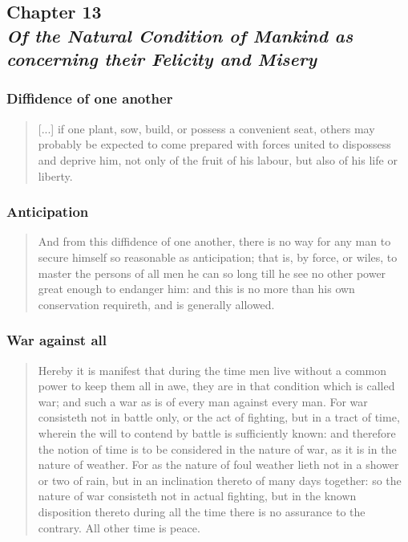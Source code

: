     \subsection[Of the Natural Condition of Mankind as concerning their Felicity and Misery]{Chapter 13 \\ \textit{Of the Natural Condition of Mankind as concerning their Felicity and Misery}}

        \subsubsection{Diffidence of one another}

            \begin{quote}
                [...] if one plant, sow, build, or possess a convenient seat, others may probably be expected to come prepared with forces united to dispossess and deprive him, not only of the fruit of his labour, but also of his life or liberty.
            \end{quote}

        \subsubsection{Anticipation}

            \begin{quote}
                And from this diffidence of one another, there is no way for any man to secure himself so reasonable as anticipation; that is, by force, or wiles, to master the persons of all men he can so long till he see no other power great enough to endanger him: and this is no more than his own conservation requireth, and is generally allowed.
            \end{quote}

        \subsubsection{War against all}

            \begin{quote}
                Hereby it is manifest that during the time men live without a common power to keep them all in awe, they are in that condition which is called war; and such a war as is of every man against every man. For war consisteth not in battle only, or the act of fighting, but in a tract of time, wherein the will to contend by battle is sufficiently known: and therefore the notion of time is to be considered in the nature of war, as it is in the nature of weather. For as the nature of foul weather lieth not in a shower or two of rain, but in an inclination thereto of many days together: so the nature of war consisteth not in actual fighting, but in the known disposition thereto during all the time there is no assurance to the contrary. All other time is peace.
            \end{quote}

